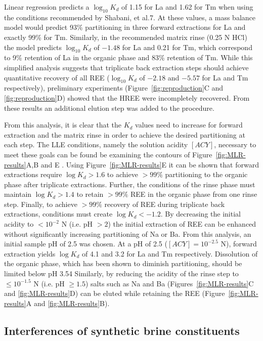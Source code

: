 Linear regression predicts a $\log_{10} K_d$ of 1.15 for La and 1.62 for Tm when using the conditions recommended by Shabani, et al.7.
At these values, a mass balance model would predict 93\% partitioning in three forward extractions for La and exactly 99\% for Tm.
Similarly, in the recommended matrix rinse (0.25 N HCl) the model predicts $\log_{10} K_d$ of $-1.48$ for La and 0.21 for Tm, which correspond to 9\% retention of La in the organic phase and 83\% retention of Tm.
While this simplified analysis suggests that triplicate back extraction steps should achieve quantitative recovery of all REE ($\log_{10} K_d$ of $-2.18$ and $-5.57$ for La and Tm respectively), preliminary experiments (Figure~\ref{fig:reproduction}C and \ref{fig:reproduction}D) showed that the HREE were incompletely recovered. From these results an additional elution step was added to the procedure. 

From this analysis, it is clear that the $K_d$ values need to increase for forward extraction and the matrix rinse in order to achieve the desired partitioning at each step.
The LLE conditions, namely the solution acidity $[ACY]$, necessary to meet these goals can be found be examining the contours of Figure~\ref{fig:MLR-results}A,B and E .
Using Figure~\ref{fig:MLR-results}E it can be shown that forward extractions require $\log K_d>1.6$ to achieve $>99\%$ partitioning to the organic phase after triplicate extractions. Further, the conditions of the rinse phase must maintain $\log K_d>1.4$  to retain $>99\%$ REE in the organic phase from one rinse step. Finally, to achieve $>99\%$ recovery of REE during triplicate back extractions, conditions must create $\log K_d<-1.2$.
By decreasing the initial acidity to $<10^{-2}$ N (i.e. pH $>2$) the initial extraction of REE can be enhanced without significantly increasing partitioning of Na or Ba. From this analysis, an initial sample pH of 2.5 was chosen.
At a pH of 2.5 ($[ACY] = 10^{-2.5}$ N), forward extraction yields $\log K_d$ of 4.1 and 3.2 for La and Tm respectively.
Dissolution of the organic phase, which has been shown to diminish partitioning, should be limited below pH 3.54
Similarly, by reducing the acidity of the rinse step to $\leq10^{-1.5}$ N (i.e. pH $\geq1.5$) salts such as Na and Ba (Figures~\ref{fig:MLR-results}C and \ref{fig:MLR-results}D) can be eluted while retaining the REE (Figure~\ref{fig:MLR-results}A and \ref{fig:MLR-results}B).

\subsection{Interferences of synthetic brine constituents}

